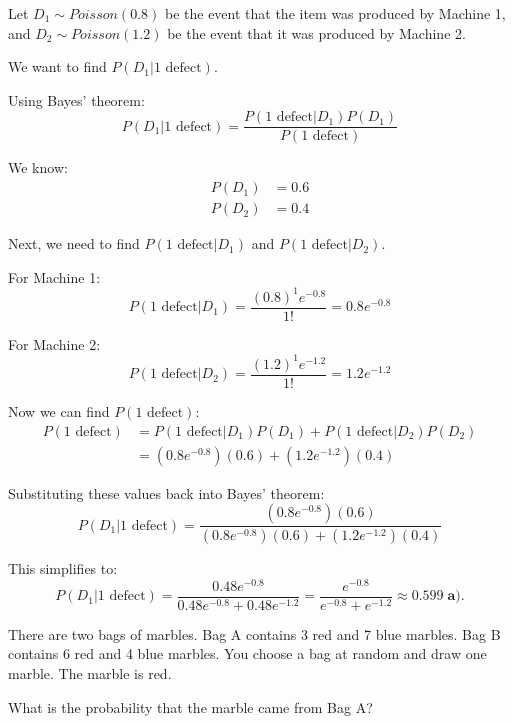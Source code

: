 \documentclass[a4paper, 10pt]{article}
\begin{document}
\begin{solution}
Let \( D_1 \sim Poisson(0.8) \) be the event that the item was produced by Machine 1,
and \( D_2 \sim Poisson(1.2) \) be the event that it was produced by Machine 2.

\vspace{2mm}

\par\noindent We want to find \( P(D_1 | 1 \text{ defect}) \).

Using Bayes' theorem:
\[
P(D_1 | 1 \text{ defect}) = \frac{P(1 \text{ defect} | D_1) P(D_1)}{P(1 \text{ defect})}
\]

We know:
\begin{align*}
    P(D_1) &= 0.6 \\
    P(D_2) &= 0.4
\end{align*}

Next, we need to find \( P(1 \text{ defect} | D_1) \) and \( P(1 \text{ defect} | D_2) \).

For Machine 1:
\[
P(1 \text{ defect} | D_1) = \frac{(0.8)^1 e^{-0.8}}{1!} = 0.8 e^{-0.8}
\]

For Machine 2:
\[
P(1 \text{ defect} | D_2) = \frac{(1.2)^1 e^{-1.2}}{1!} = 1.2 e^{-1.2}
\]

Now we can find \( P(1 \text{ defect}) \):
\begin{align*}
    P(1 \text{ defect}) &= P(1 \text{ defect} | D_1) P(D_1) + P(1 \text{ defect} | D_2) P(D_2) \\
    &= (0.8 e^{-0.8})(0.6) + (1.2 e^{-1.2})(0.4)
\end{align*}

Substituting these values back into Bayes' theorem:
\[
P(D_1 | 1 \text{ defect}) = \frac{(0.8 e^{-0.8})(0.6)}{(0.8 e^{-0.8})(0.6) + (1.2 e^{-1.2})(0.4)}
\]

This simplifies to:
\[
P(D_1 | 1 \text{ defect}) = \frac{0.48 e^{-0.8}}{0.48 e^{-0.8} + 0.48 e^{-1.2}} = \frac{e^{-0.8}}{e^{-0.8} + e^{-1.2}}
\approx \boxed{0.599} \; \textbf{a).}
\]
\end{solution}


\begin{problem}
There are two bags of marbles. Bag A contains 3 red and 7 blue marbles.
Bag B contains 6 red and 4 blue marbles. You choose a bag at random and draw one marble. The marble is red.
\begin{subproblems}
    \item What is the probability that the marble came from Bag A?
\end{subproblems}
\end{problem}
\end{document}
